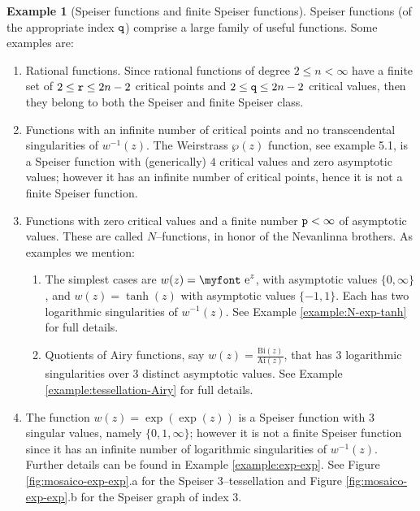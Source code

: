 \documentclass[final,3p,times]{elsarticle}
\newcommand{\e}{{\text{\myfont e}}}
\newcommand{\Ai}{{\text{Ai}}}
\newcommand{\Bi}{{\text{Bi}}}
\theoremstyle{definition}
\newtheorem{example}{Example}[section]
\begin{document}
\begin{example}[Speiser functions and finite Speiser functions]
\label{ex:examples-finite-non-finite-Speiser-fns}
Speiser functions (of the appropriate index $\tt q$) 
comprise a large family of useful functions. Some examples are:
\begin{enumerate}[label=\arabic*.,leftmargin=*]
\item
Rational functions. Since rational functions of degree 
$2\leq n < \infty$ have a finite set of 
$2 \leq {\tt r} \leq 2n-2$
critical points and 
$2 \leq {\tt q} \leq 2n-2$
critical values, then
they belong
to both the Speiser and finite Speiser class.

\item 
Functions with an infinite number of critical points 
and no transcendental singularities of $w^{-1}(z)$. 
The Weirstrass $\wp(z)$ function, 
see \cite{AlvarezGutierrezMucino} example 5.1, 
is a Speiser function with (generically) $4$ critical values 
and zero asymptotic values; 
however it has an infinite number of critical points, 
hence it is not a finite Speiser function.

\item 
Functions with zero critical values and a finite number ${\tt p}<\infty$ of asymptotic values.
These are called $N$--functions, in honor of the Nevanlinna brothers. As examples we mention:
\begin{enumerate}[label=\alph*),leftmargin=*]

\item 
The simplest cases are $w(z)= \e^z$, with asymptotic values $\{0,\infty \}$, 
and $w(z)=\tanh(z)$ with asymptotic values $\{ -1, 1 \}$. 
Each has two logarithmic singularities of $w^{-1}(z)$.
See Example \ref{example:N-exp-tanh} for full details.

\item 
Quotients of Airy functions, say $w(z)=\frac{\Bi(z)}{\Ai(z)}$, 
that has $3$ logarithmic singularities 
over 3 distinct asymptotic values.
See Example \ref{example:tessellation-Airy} for full details.
\end{enumerate}

\item 
The function $w(z)=\exp(\exp(z))$ is a Speiser function with $3$ singular values, 
namely $\{0, 1, \infty\}$; 
however it is not a finite Speiser function since it has an infinite number of logarithmic singularities 
of $w^{-1}(z)$. Further details can be found in Example \ref{example:exp-exp}.
See Figure \ref{fig:mosaico-exp-exp}.a for the Speiser 3--tessellation and 
Figure \ref{fig:mosaico-exp-exp}.b for the Speiser graph of index 3.


\end{enumerate}
\end{example}
\end{document}
